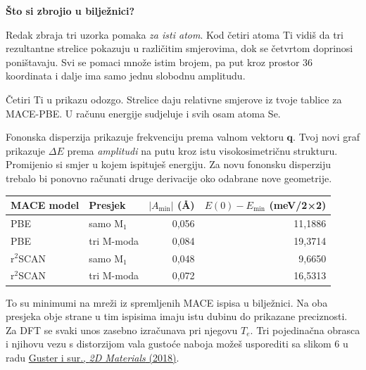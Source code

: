 \documentclass[12pt,a4paper]{article}
\newcommand{\sect}[1]{\vspace{4pt}\noindent{\large\sffamily\bfseries\color{ink}#1}\par}
\newcommand{\titlepagepart}[1]{{\fontsize{23}{28}\selectfont\sffamily\bfseries\color{ink}#1}\par\vspace{3pt}}
\newcommand{\code}[1]{\texttt{\detokenize{#1}}}
\begin{document}
\newpage
\titlepagepart{Što si zbrojio u bilježnici?}
Redak \code{u = mod1["u"] + mod2["u"] + mod3["u"]} zbraja tri uzorka pomaka \emph{za isti atom}. Kod četiri atoma Ti vidiš da tri rezultantne strelice pokazuju u različitim smjerovima, dok se četvrtom doprinosi poništavaju. Svi se pomaci množe istim brojem, pa put kroz prostor 36 koordinata i dalje ima samo jednu slobodnu amplitudu.

\begin{center}
\end{center}
{\small Četiri Ti u prikazu odozgo. Strelice daju relativne smjerove iz tvoje tablice za MACE-PBE. U računu energije sudjeluje i svih osam atoma Se.}

\sect{Što je na osi grafa?}
Fononska disperzija prikazuje frekvenciju prema valnom vektoru \(\mathbf q\). Tvoj novi graf prikazuje \(\Delta E\) prema \emph{amplitudi} na putu kroz istu visokosimetričnu strukturu. Promijenio si smjer u kojem ispituješ energiju. Za novu fononsku disperziju trebalo bi ponovno računati druge derivacije oko odabrane nove geometrije.

\begin{center}\begin{tabular}{@{}llrr@{}}\toprule
MACE model & Presjek & \(\lvert A_\mathrm{min}\rvert\) (Å) & \(E(0)-E_\mathrm{min}\) (meV/2×2)\\\midrule
PBE & samo M$_1$ & 0,056 & 11,1886\\
PBE & tri M-moda & 0,084 & 19,3714\\
r$^2$SCAN & samo M$_1$ & 0,048 & 9,6650\\
r$^2$SCAN & tri M-moda & 0,072 & 16,5313\\\bottomrule
\end{tabular}\end{center}
To su minimumi na mreži iz spremljenih MACE ispisa u bilježnici. Na oba presjeka obje strane u tim ispisima imaju istu dubinu do prikazane preciznosti. Za DFT se svaki unos zasebno izračunava pri njegovu \(T_e\). Tri pojedinačna obrasca i njihovu vezu s distorzijom vala gustoće naboja možeš usporediti sa slikom 6 u radu \href{https://ddd.uab.cat/pub/artpub/2018/195676/2dmaterials_a2018v5n2p025024.pdf}{Guster i sur., \emph{2D Materials} (2018)}.
\end{document}
